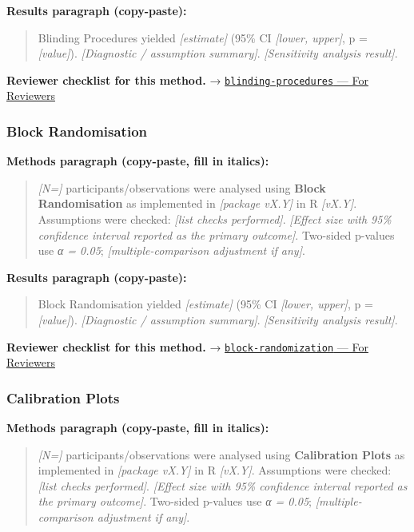 \documentclass[
]{article}
\begin{document}
\textbf{Results paragraph (copy-paste):}

\begin{quote}
Blinding Procedures yielded \emph{{[}estimate{]}} (95\% CI
\emph{{[}lower, upper{]}}, p = \emph{{[}value{]}}). \emph{{[}Diagnostic
/ assumption summary{]}}. \emph{{[}Sensitivity analysis result{]}}.
\end{quote}

\textbf{Reviewer checklist for this method.} →
\href{../chapters/14-clinical/blinding-procedures.Rmd\#for-reviewers}{\texttt{blinding-procedures}
--- For Reviewers}

\subsubsection{Block Randomisation}\label{block-randomisation}

\textbf{Methods paragraph (copy-paste, fill in italics):}

\begin{quote}
\emph{{[}N={]}} participants/observations were analysed using
\textbf{Block Randomisation} as implemented in \emph{{[}package vX.Y{]}}
in R \emph{{[}vX.Y{]}}. Assumptions were checked: \emph{{[}list checks
performed{]}}. \emph{{[}Effect size with 95\% confidence interval
reported as the primary outcome{]}}. Two-sided p-values use \emph{α =
0.05}; \emph{{[}multiple-comparison adjustment if any{]}}.
\end{quote}

\textbf{Results paragraph (copy-paste):}

\begin{quote}
Block Randomisation yielded \emph{{[}estimate{]}} (95\% CI
\emph{{[}lower, upper{]}}, p = \emph{{[}value{]}}). \emph{{[}Diagnostic
/ assumption summary{]}}. \emph{{[}Sensitivity analysis result{]}}.
\end{quote}

\textbf{Reviewer checklist for this method.} →
\href{../chapters/14-clinical/block-randomization.Rmd\#for-reviewers}{\texttt{block-randomization}
--- For Reviewers}

\subsubsection{Calibration Plots}\label{calibration-plots}

\textbf{Methods paragraph (copy-paste, fill in italics):}

\begin{quote}
\emph{{[}N={]}} participants/observations were analysed using
\textbf{Calibration Plots} as implemented in \emph{{[}package vX.Y{]}}
in R \emph{{[}vX.Y{]}}. Assumptions were checked: \emph{{[}list checks
performed{]}}. \emph{{[}Effect size with 95\% confidence interval
reported as the primary outcome{]}}. Two-sided p-values use \emph{α =
0.05}; \emph{{[}multiple-comparison adjustment if any{]}}.
\end{quote}
\end{document}
